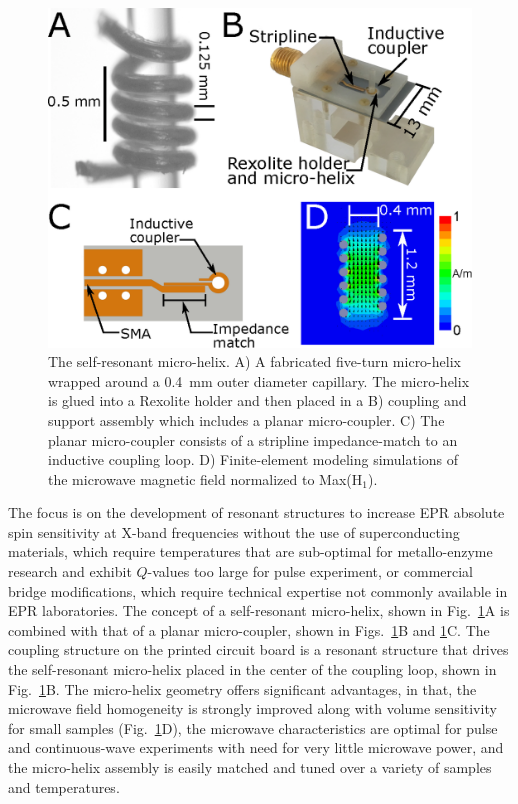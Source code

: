 \begin{figure}[htb]
\centering
 \includegraphics{Kapitel/Ch4-Images/01-MicroHelixHolder_Big2.eps}
 \caption[The self-resonant micro-helix.]{ The self-resonant micro-helix. A) A fabricated five-turn micro-helix wrapped around a 0.4~mm outer diameter capillary. The micro-helix is glued into a Rexolite holder and then placed in a B) coupling and support assembly which includes a planar micro-coupler. C) The planar micro-coupler consists of a stripline impedance-match to an inductive coupling loop. D) Finite-element modeling simulations of the microwave magnetic field normalized to Max(H$_1$).}
 \label{fig:fabricated}
\end{figure}

The focus is on the development of resonant structures to increase EPR absolute spin sensitivity at X-band frequencies without the use of superconducting materials, which require temperatures that are sub-optimal for metallo-enzyme research and exhibit $Q$-values too large for pulse experiment, or commercial bridge modifications, which require technical expertise not commonly available in EPR laboratories. The concept of a self-resonant micro-helix, shown in Fig.~\ref{fig:fabricated}A is combined with that of a planar micro-coupler, shown in Figs.~\ref{fig:fabricated}B and \ref{fig:fabricated}C. The coupling structure on the printed circuit board is a resonant structure that drives the self-resonant micro-helix placed in the center of the coupling loop,\cite{coupling2016} shown in Fig.~\ref{fig:fabricated}B. The micro-helix geometry offers significant advantages, in that, the microwave field homogeneity is strongly improved along with volume sensitivity for small samples (Fig.~\ref{fig:fabricated}D), the microwave characteristics are optimal for pulse and continuous-wave experiments with need for very little microwave power, and the micro-helix assembly is easily matched and tuned over a variety of samples and temperatures.

